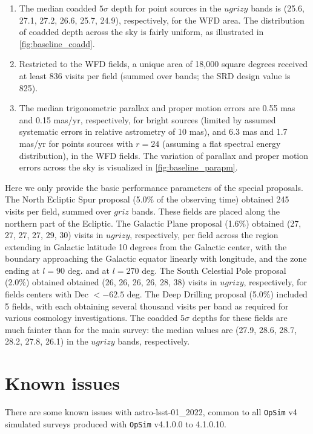 \documentclass[DM,authoryear,toc]{lsstdoc}
\newcommand{\opsim}{\texttt{OpSim}\xspace}
\begin{document}
\begin{enumerate}
\item The median coadded $5\sigma$ depth
for point sources in the $ugrizy$ bands is (25.6, 27.1, 27.2, 26.6,
25.7, 24.9), respectively, for the WFD area. The distribution
of coadded depth across the sky is fairly uniform, as illustrated in \autoref{fig:baseline_coadd}.

\item Restricted to the WFD fields, a unique area of
18,000 square degrees received at least 836 visits per field (summed over bands;
the SRD design value is 825).

\item The median trigonometric parallax and proper motion errors are
0.55 mas and 0.15 mas/yr, respectively, for bright sources (limited by
assumed systematic errors in relative astrometry of 10 mas), and 6.3
mas and 1.7 mas/yr for points sources with $r=24$ (assuming a flat
spectral energy distribution), in the WFD fields. The variation of parallax
and proper motion errors across the sky is visualized in \autoref{fig:baseline_parapm}.
\end{enumerate}

Here we only provide the basic
performance parameters of the special proposals. 
The North Ecliptic Spur proposal (5.0\% of the observing time) obtained  245 visits per field, summed over $griz$ bands. 
These fields are placed along the northern part of the Ecliptic. 
The Galactic Plane proposal (1.6\%) obtained (27, 27, 27, 27, 29, 30) visits in $ugrizy$, respectively, per field
across the region extending in Galactic latitude 10 degrees
from the Galactic center, with the boundary approaching the Galactic
equator linearly with longitude, and the zone ending at $l=90$ deg.
and at $l=270$ deg. 
The South Celestial Pole proposal (2.0\%) obtained
obtained (26, 26, 26, 26, 28, 38) visits in $ugrizy$, respectively, for fields centers with Dec $<-62.5$ deg. 
The Deep Drilling proposal (5.0\%) included 5 fields, with each obtaining several thousand visits per band 
as required for various cosmology investigations. The coadded $5\sigma$ depths for these fields are much 
fainter than for the main survey: the median values are (27.9, 28.6, 28.7, 28.2, 27.8, 26.1) in the $ugrizy$ bands, respectively.


\section{Known issues}

There are some known issues with astro-lsst-01\_2022, common to all \opsim v4 simulated surveys produced with \opsim v4.1.0.0 to 4.1.0.10.
\end{document}
